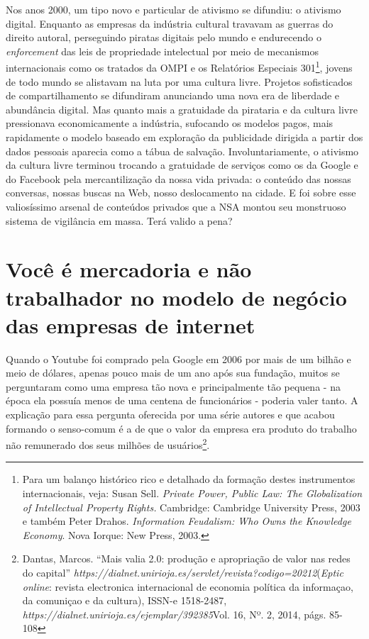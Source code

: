 Nos anos 2000, um tipo novo e particular de ativismo se difundiu: o
ativismo digital. Enquanto as empresas da indústria cultural travavam as
guerras do direito autoral, perseguindo piratas digitais pelo mundo e
endurecendo o \emph{enforcement} das leis de propriedade intelectual por
meio de mecanismos internacionais como os tratados da OMPI e os
Relatórios Especiais 301\footnote{Para um balanço
  histórico rico e detalhado da formação destes instrumentos
  internacionais, veja: Susan Sell. \emph{Private Power, Public Law: The
  Globalization of Intellectual Property Rights.} Cambridge: Cambridge
  University Press, 2003 e também Peter Drahos. \emph{Information
  Feudalism: Who Owns the Knowledge Economy}. Nova Iorque: New Press,
  2003.}, jovens de todo mundo se alistavam na luta por uma cultura
livre. Projetos sofisticados de compartilhamento se difundiram
anunciando uma nova era de liberdade e abundância digital. Mas quanto
mais a gratuidade da pirataria e da cultura livre pressionava
economicamente a indústria, sufocando os modelos pagos, mais rapidamente
o modelo baseado em exploração da publicidade dirigida a partir dos
dados pessoais aparecia como a tábua de salvação. Involuntariamente, o
ativismo da cultura livre terminou trocando a gratuidade de serviços
como os da Google e do Facebook pela mercantilização da nossa vida
privada: o conteúdo das nossas conversas, nossas buscas na Web, nosso
deslocamento na cidade. E foi sobre esse valiosíssimo arsenal de
conteúdos privados que a NSA montou seu monstruoso sistema de vigilância
em massa. Terá valido a pena?

\section{Você é mercadoria e não trabalhador no modelo de negócio das
empresas de internet}

Quando o Youtube foi comprado pela Google em 2006 por mais de um bilhão
e meio de dólares, apenas pouco mais de um ano após sua fundação, muitos
se perguntaram como uma empresa tão nova e principalmente tão pequena -
na época ela possuía menos de uma centena de funcionários - poderia
valer tanto. A explicação para essa pergunta oferecida por uma série
autores e que acabou formando o senso-comum é a de que o valor da
empresa era produto do trabalho não remunerado dos seus milhões de
usuários\footnote{Dantas, Marcos. ``Mais valia 2.0:
  produção e apropriação de valor nas redes do capital''
  \emph{https://dialnet.unirioja.es/servlet/revista?codigo=20212}(\emph{Eptic
    online}: revista electronica internacional de economia política da
  informaçao, da comuniçao e da cultura), ISSN-e 1518-2487,
  \emph{https://dialnet.unirioja.es/ejemplar/392385}{{Vol. 16, Nº. 2,
  2014}}, págs. 85-108}.

